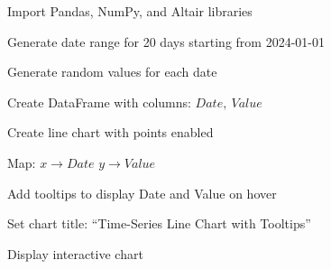 \begin{algorithm}
\caption{Time-Series Line Chart with Tooltips using Altair}
\begin{algorithmic}[1]

\STATE Import Pandas, NumPy, and Altair libraries

\STATE Generate date range for 20 days starting from 2024-01-01

\STATE Generate random values for each date

\STATE Create DataFrame with columns:
\STATE $Date,\ Value$

\STATE Create line chart with points enabled

\STATE Map:
\STATE $x \rightarrow Date$
\STATE $y \rightarrow Value$

\STATE Add tooltips to display Date and Value on hover

\STATE Set chart title: ``Time-Series Line Chart with Tooltips''

\STATE Display interactive chart

\end{algorithmic}
\end{algorithm}